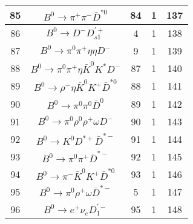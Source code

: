 \documentclass[landscape]{article}
\begin{document}
\begin{table}[htbp!]
\begin{tabular}{|c|c|c|c|c|}
\hline
85 & $ B^{0} \rightarrow \pi^{+} \pi^{-} \bar{D}^{*0} $ & 84 & 1 & 137 \\
\hline
86 & $ B^{0} \rightarrow D^{-} D_{s1}^{\prime+} $ & 4 & 1 & 138 \\
\hline
87 & $ B^{0} \rightarrow \pi^{0} \pi^{+} \eta \eta D^{-} $ & 9 & 1 & 139 \\
\hline
88 & $ B^{0} \rightarrow \pi^{0} \pi^{+} \eta \bar{K}^{0} K^{*} D^{-} $ & 87 & 1 & 140 \\
\hline
89 & $ B^{0} \rightarrow \rho^{-} \eta \bar{K}^{0} K^{+} \bar{D}^{*0} $ & 88 & 1 & 141 \\
\hline
90 & $ B^{0} \rightarrow \pi^{0} \pi^{0} \bar{D}^{0} $ & 89 & 1 & 142 \\
\hline
91 & $ B^{0} \rightarrow \pi^{0} \rho^{0} \rho^{+} \omega D^{-} $ & 90 & 1 & 143 \\
\hline
92 & $ B^{0} \rightarrow K^{0} D^{*+} \bar{D}^{*-} $ & 91 & 1 & 144 \\
\hline
93 & $ B^{0} \rightarrow \pi^{0} \pi^{+} \bar{D}^{*-} $ & 92 & 1 & 145 \\
\hline
94 & $ B^{0} \rightarrow \pi^{-} \bar{K}^{0} K^{+} \bar{D}^{*0} $ & 93 & 1 & 146 \\
\hline
95 & $ B^{0} \rightarrow \pi^{0} \rho^{+} \omega \bar{D}^{*-} $ & 5 & 1 & 147 \\
\hline
96 & $ B^{0} \rightarrow e^{+} \nu_{e} D_{1}^{\prime-} $ & 95 & 1 & 148 \\
\hline
\end{tabular}
\end{table}

\clearpage
\end{document}
